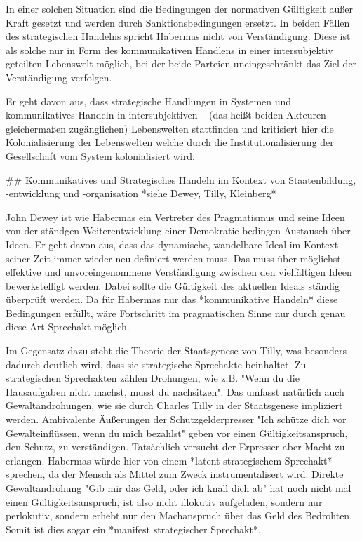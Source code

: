 In einer solchen Situation sind die Bedingungen der normativen Gültigkeit außer Kraft gesetzt und werden durch Sanktionsbedingungen ersetzt.
In beiden Fällen des strategischen Handelns spricht Habermas nicht von Verständigung.
Diese ist als solche nur in Form des kommunikativen Handlens in einer intersubjektiv geteilten Lebenswelt möglich, bei der beide Parteien uneingeschränkt das Ziel der Verständigung verfolgen.

Er geht davon aus, dass strategische Handlungen in Systemen und kommunikatives Handeln in intersubjektiven ~ (das heißt beiden Akteuren gleichermaßen zugänglichen) Lebenswelten stattfinden und kritisiert hier die Kolonialisierung der Lebenswelten welche durch die Institutionalisierung der Gesellschaft vom System kolonialisiert wird.


## Kommunikatives und Strategisches Handeln im Kontext von Staatenbildung, -entwicklung und -organisation
*siehe Dewey, Tilly, Kleinberg*

John Dewey ist wie Habermas ein Vertreter des Pragmatismus und seine Ideen von der ständgen Weiterentwicklung einer Demokratie bedingen Austausch über Ideen.
Er geht davon aus, dass das dynamische, wandelbare Ideal im Kontext seiner Zeit immer wieder neu definiert werden muss.
Das muss über möglichst effektive und unvoreingenommene Verständigung zwischen den vielfältigen Ideen bewerkstelligt werden.
Dabei sollte die Gültigkeit des aktuellen Ideals ständig überprüft werden.
Da für Habermas nur das *kommunikative Handeln* diese Bedingungen erfüllt, wäre Fortschritt im pragmatischen Sinne nur durch genau diese Art Sprechakt möglich.

Im Gegensatz dazu steht die Theorie der Staatsgenese von Tilly, was besonders dadurch deutlich wird, dass sie strategische Sprechakte beinhaltet.
Zu strategischen Sprechakten zählen Drohungen, wie z.B. "Wenn du die Hausaufgaben nicht machst, musst du nachsitzen".
Das umfasst natürlich auch Gewaltandrohungen, wie sie durch Charles Tilly in der Staatsgenese impliziert werden.
Ambivalente Äußerungen der Schutzgelderpresser "Ich schütze dich vor Gewalteinflüssen, wenn du mich bezahlst" geben vor einen Gültigkeitsanspruch, den Schutz, zu verständigen.
Tatsächlich versucht der Erpresser aber Macht zu erlangen.
Habermas würde hier von einem *latent strategischem Sprechakt* sprechen, da der Mensch als Mittel zum Zweck instrumentalisert wird.
Direkte Gewaltandrohung "Gib mir das Geld, oder ich knall dich ab" hat noch nicht mal einen Gültigkeitsanspruch, ist also nicht illokutiv aufgeladen, sondern nur perlokutiv, sondern erhebt nur den Machanspruch über das Geld des Bedrohten.
Somit ist dies sogar ein *manifest strategischer Sprechakt*.

